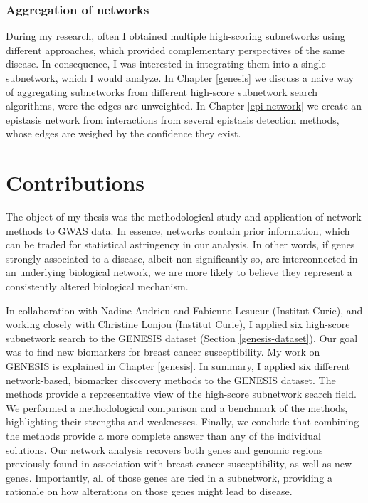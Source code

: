 \documentclass[
  11pt,
]{env/yjiao}
\begin{document}
\hypertarget{aggregation-of-networks}{%
\subsubsection{Aggregation of networks}\label{aggregation-of-networks}}

During my research, often I obtained multiple high-scoring subnetworks using different approaches, which provided complementary perspectives of the same disease. In consequence, I was interested in integrating them into a single subnetwork, which I would analyze. In Chapter \ref{genesis} we discuss a naive way of aggregating subnetworks from different high-score subnetwork search algorithms, were the edges are unweighted. In Chapter \ref{epi-network} we create an epistasis network from interactions from several epistasis detection methods, whose edges are weighed by the confidence they exist.

\hypertarget{contributions}{%
\section{Contributions}\label{contributions}}

The object of my thesis was the methodological study and application of network methods to GWAS data. In essence, networks contain prior information, which can be traded for statistical astringency in our analysis. In other words, if genes strongly associated to a disease, albeit non-significantly so, are interconnected in an underlying biological network, we are more likely to believe they represent a consistently altered biological mechanism.

In collaboration with Nadine Andrieu and Fabienne Lesueur (Institut Curie), and working closely with Christine Lonjou (Institut Curie), I applied six high-score subnetwork search to the GENESIS dataset (Section \ref{genesis-dataset}). Our goal was to find new biomarkers for breast cancer susceptibility. My work on GENESIS is explained in Chapter \ref{genesis}. In summary, I applied six different network-based, biomarker discovery methods to the GENESIS dataset. The methods provide a representative view of the high-score subnetwork search field. We performed a methodological comparison and a benchmark of the methods, highlighting their strengths and weaknesses. Finally, we conclude that combining the methods provide a more complete answer than any of the individual solutions. Our network analysis recovers both genes and genomic regions previously found in association with breast cancer susceptibility, as well as new genes. Importantly, all of those genes are tied in a subnetwork, providing a rationale on how alterations on those genes might lead to disease.
\end{document}
